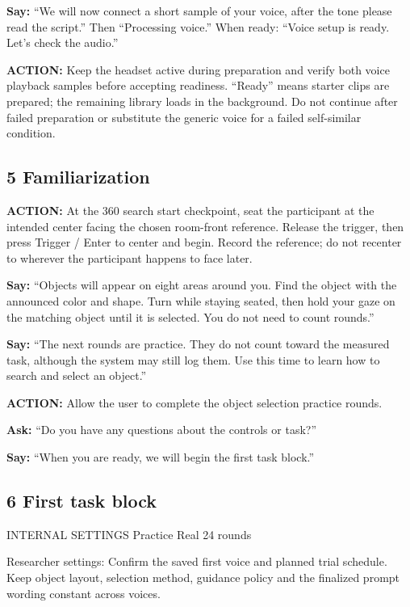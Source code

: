 \textbf{Say:} ``We will now connect a short sample of your voice, after the tone
please read the script.'' Then ``Processing voice.'' When ready: ``Voice
setup is ready. Let's check the audio.''

\textbf{ACTION:} Keep the headset active during preparation and verify both voice
playback samples before accepting readiness. ``Ready'' means starter
clips are prepared; the remaining library loads in the background. Do
not continue after failed preparation or substitute the generic voice
for a failed self-similar condition.

\subsection{5 Familiarization}\label{familiarization}

\textbf{ACTION:} At the 360 search start checkpoint, seat the participant at the
intended center facing the chosen room-front reference. Release the
trigger, then press Trigger / Enter to center and begin. Record the
reference; do not recenter to wherever the participant happens to face
later.

\textbf{Say:} ``Objects will appear on eight areas around you. Find the object
with the announced color and shape. Turn while staying seated, then hold
your gaze on the matching object until it is selected. You do not need
to count rounds.''

\textbf{Say:} ``The next rounds are practice. They do not count toward the
measured task, although the system may still log them. Use this time to
learn how to search and select an object.''

\textbf{ACTION:} Allow the user to complete the object selection practice rounds.

\textbf{Ask:} ``Do you have any questions about the controls or task?''

\textbf{Say:} ``When you are ready, we will begin the first task block.''

\clearpage
\subsection{6 First task block}\label{first-task-block}

INTERNAL SETTINGS Practice \textbar{} Real \textbar{} 24 rounds

Researcher settings: Confirm the saved first voice and planned trial
schedule. Keep object layout, selection method, guidance policy and the
finalized prompt wording constant across voices.

